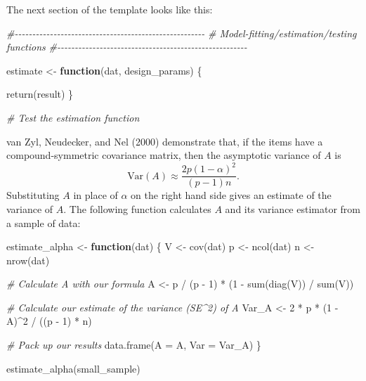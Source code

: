 \documentclass[
]{book}
\newenvironment{Shaded}{\begin{snugshade}}{\end{snugshade}}
\newcommand{\AttributeTok}[1]{\textcolor[rgb]{0.77,0.63,0.00}{#1}}
\newcommand{\CommentTok}[1]{\textcolor[rgb]{0.56,0.35,0.01}{\textit{#1}}}
\newcommand{\ControlFlowTok}[1]{\textcolor[rgb]{0.13,0.29,0.53}{\textbf{#1}}}
\newcommand{\DecValTok}[1]{\textcolor[rgb]{0.00,0.00,0.81}{#1}}
\newcommand{\FunctionTok}[1]{\textcolor[rgb]{0.00,0.00,0.00}{#1}}
\newcommand{\NormalTok}[1]{#1}
\newcommand{\OtherTok}[1]{\textcolor[rgb]{0.56,0.35,0.01}{#1}}
\newcommand{\SpecialCharTok}[1]{\textcolor[rgb]{0.00,0.00,0.00}{#1}}
\begin{document}
The next section of the template looks like this:

\begin{Shaded}
\begin{Highlighting}[]
\CommentTok{\#{-}{-}{-}{-}{-}{-}{-}{-}{-}{-}{-}{-}{-}{-}{-}{-}{-}{-}{-}{-}{-}{-}{-}{-}{-}{-}{-}{-}{-}{-}{-}{-}{-}{-}{-}{-}{-}{-}{-}{-}{-}{-}{-}{-}{-}{-}{-}{-}{-}{-}{-}{-}{-}{-}}
\CommentTok{\# Model{-}fitting/estimation/testing functions}
\CommentTok{\#{-}{-}{-}{-}{-}{-}{-}{-}{-}{-}{-}{-}{-}{-}{-}{-}{-}{-}{-}{-}{-}{-}{-}{-}{-}{-}{-}{-}{-}{-}{-}{-}{-}{-}{-}{-}{-}{-}{-}{-}{-}{-}{-}{-}{-}{-}{-}{-}{-}{-}{-}{-}{-}{-}}

\NormalTok{estimate }\OtherTok{\textless{}{-}} \ControlFlowTok{function}\NormalTok{(dat, design\_params) \{}

  \FunctionTok{return}\NormalTok{(result)}
\NormalTok{\}}

\CommentTok{\# Test the estimation function}
\end{Highlighting}
\end{Shaded}

van Zyl, Neudecker, and Nel (2000) demonstrate that, if the items have a compound-symmetric covariance matrix, then the asymptotic variance of \(A\) is
\[
\text{Var}(A) \approx \frac{2p(1 - \alpha)^2}{(p - 1) n}.
\]
Substituting \(A\) in place of \(\alpha\) on the right hand side gives an estimate of the variance of \(A\). The following function calculates \(A\) and its variance estimator from a sample of data:

\begin{Shaded}
\begin{Highlighting}[]
\NormalTok{estimate\_alpha }\OtherTok{\textless{}{-}} \ControlFlowTok{function}\NormalTok{(dat) \{}
\NormalTok{  V }\OtherTok{\textless{}{-}} \FunctionTok{cov}\NormalTok{(dat)}
\NormalTok{  p }\OtherTok{\textless{}{-}} \FunctionTok{ncol}\NormalTok{(dat)}
\NormalTok{  n }\OtherTok{\textless{}{-}} \FunctionTok{nrow}\NormalTok{(dat)}
  
  \CommentTok{\# Calculate A with our formula}
\NormalTok{  A }\OtherTok{\textless{}{-}}\NormalTok{ p }\SpecialCharTok{/}\NormalTok{ (p }\SpecialCharTok{{-}} \DecValTok{1}\NormalTok{) }\SpecialCharTok{*}\NormalTok{ (}\DecValTok{1} \SpecialCharTok{{-}} \FunctionTok{sum}\NormalTok{(}\FunctionTok{diag}\NormalTok{(V)) }\SpecialCharTok{/} \FunctionTok{sum}\NormalTok{(V))}
  
  \CommentTok{\# Calculate our estimate of the variance (SE\^{}2) of A}
\NormalTok{  Var\_A }\OtherTok{\textless{}{-}} \DecValTok{2} \SpecialCharTok{*}\NormalTok{ p }\SpecialCharTok{*}\NormalTok{ (}\DecValTok{1} \SpecialCharTok{{-}}\NormalTok{ A)}\SpecialCharTok{\^{}}\DecValTok{2} \SpecialCharTok{/}\NormalTok{ ((p }\SpecialCharTok{{-}} \DecValTok{1}\NormalTok{) }\SpecialCharTok{*}\NormalTok{ n)}
  
  \CommentTok{\# Pack up our results}
  \FunctionTok{data.frame}\NormalTok{(}\AttributeTok{A =}\NormalTok{ A, }\AttributeTok{Var =}\NormalTok{ Var\_A)}
\NormalTok{\}}

\FunctionTok{estimate\_alpha}\NormalTok{(small\_sample)}
\end{Highlighting}
\end{Shaded}
\end{document}
